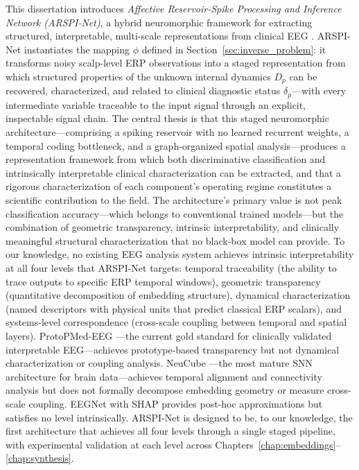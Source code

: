 This dissertation introduces \emph{Affective Reservoir-Spike Processing and Inference Network (ARSPI-Net)}, a hybrid neuromorphic framework for extracting structured, interpretable, multi-scale representations from clinical EEG \cite{lane2023towards, lane2024towards}. ARSPI-Net instantiates the mapping $\phi$ defined in Section~\ref{sec:inverse_problem}: it transforms noisy scalp-level ERP observations into a staged representation from which structured properties of the unknown internal dynamics $D_p$ can be recovered, characterized, and related to clinical diagnostic status $\delta_p$---with every intermediate variable traceable to the input signal through an explicit, inspectable signal chain. The central thesis is that this staged neuromorphic architecture---comprising a spiking reservoir with no learned recurrent weights, a temporal coding bottleneck, and a graph-organized spatial analysis---produces a representation framework from which both discriminative classification and intrinsically interpretable clinical characterization can be extracted, and that a rigorous characterization of each component's operating regime constitutes a scientific contribution to the field. The architecture's primary value is not peak classification accuracy---which belongs to conventional trained models---but the combination of geometric transparency, intrinsic interpretability, and clinically meaningful structural characterization that no black-box model can provide. To our knowledge, no existing EEG analysis system achieves intrinsic interpretability at all four levels that ARSPI-Net targets: temporal traceability (the ability to trace outputs to specific ERP temporal windows), geometric transparency (quantitative decomposition of embedding structure), dynamical characterization (named descriptors with physical units that predict classical ERP scalars), and systems-level correspondence (cross-scale coupling between temporal and spatial layers). ProtoPMed-EEG \cite{barnett_protopmed_2024}---the current gold standard for clinically validated interpretable EEG---achieves prototype-based transparency but not dynamical characterization or coupling analysis. NeuCube \cite{kasabov_neucube_2014}---the most mature SNN architecture for brain data---achieves temporal alignment and connectivity analysis but does not formally decompose embedding geometry or measure cross-scale coupling. EEGNet with SHAP provides post-hoc approximations but satisfies no level intrinsically. ARSPI-Net is designed to be, to our knowledge, the first architecture that achieves all four levels through a single staged pipeline, with experimental validation at each level across Chapters~\ref{chap:embeddings}--\ref{chap:synthesis}.

